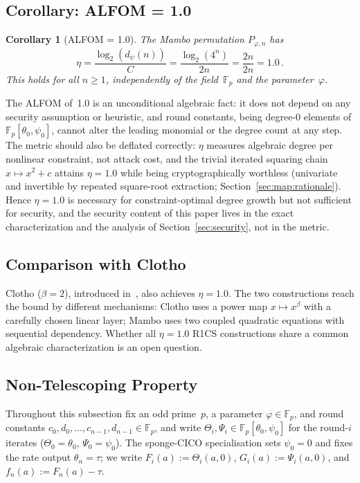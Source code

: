 \documentclass[11pt,a4paper]{article}
\newtheorem{corollary}[theorem]{Corollary}
\theoremstyle{definition}
\newcommand{\Fp}{\mathbb{F}_p}
\begin{document}
\subsection{Corollary: ALFOM = 1.0}\label{sec:degree:alfom}

\begin{corollary}[ALFOM = 1.0]\label{cor:alfom}
The Mambo permutation $P_{\varphi,n}$ has
\[
  \eta = \frac{\log_2(d_\psi(n))}{C}
       = \frac{\log_2(4^n)}{2n}
       = \frac{2n}{2n} = 1.0\,.
\]
This holds for all $n \ge 1$, independently of the field~$\Fp$ and the
parameter~$\varphi$.
\end{corollary}

The ALFOM of~1.0 is an unconditional algebraic fact: it does not
depend on any security assumption or heuristic, and round constants,
being degree-0 elements of $\Fp[\theta_0, \psi_0]$, cannot alter the
leading monomial or the degree count at any step. The metric should
also be deflated correctly: $\eta$ measures algebraic degree per
nonlinear constraint, not attack cost, and the trivial iterated
squaring chain $x \mapsto x^2 + c$ attains $\eta = 1.0$ while being
cryptographically worthless (univariate and invertible by repeated
square-root extraction; Section~\ref{sec:map:rationale}). Hence
$\eta = 1.0$ is necessary for constraint-optimal degree growth but
not sufficient for security, and the security content of this paper
lives in the exact characterization and the analysis of
Section~\ref{sec:security}, not in the metric.


\subsection{Comparison with Clotho}\label{sec:degree:clotho}

Clotho ($\beta = 2$), introduced in~\cite{ALFOMs}, also achieves
$\eta = 1.0$. The two constructions reach the bound by different mechanisms:
Clotho uses a power map $x \mapsto x^\beta$ with a carefully chosen linear
layer; Mambo uses two coupled quadratic equations with sequential
dependency. Whether all $\eta = 1.0$ R1CS constructions share a common
algebraic characterization is an open question.


\subsection{Non-Telescoping Property}\label{sec:degree:nontelescoping}

Throughout this subsection fix an odd prime~$p$, a parameter
$\varphi \in \Fp$, and round constants
$c_0, d_0, \ldots, c_{n-1}, d_{n-1} \in \Fp$, and write
$\Theta_i, \Psi_i \in \Fp[\theta_0, \psi_0]$ for the round-$i$ iterates
($\Theta_0 = \theta_0$, $\Psi_0 = \psi_0$). The sponge-CICO
specialisation sets $\psi_0 = 0$ and fixes the rate output
$\theta_n = \tau$; we write $F_i(a) := \Theta_i(a, 0)$,
$G_i(a) := \Psi_i(a, 0)$, and $f_n(a) := F_n(a) - \tau$.
\end{document}
